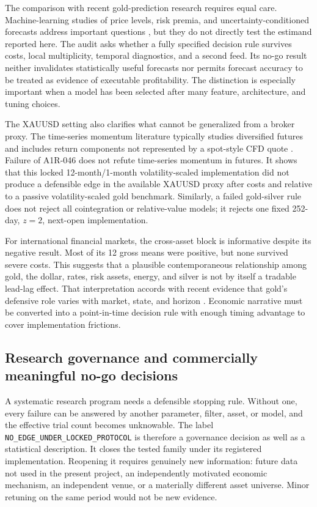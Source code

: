 The comparison with recent gold-prediction research requires equal care. Machine-learning studies of price levels, risk premia, and uncertainty-conditioned forecasts address important questions \citep{cohen2023,diaz2023,you2025}, but they do not directly test the estimand reported here. The audit asks whether a fully specified decision rule survives costs, local multiplicity, temporal diagnostics, and a second feed. Its no-go result neither invalidates statistically useful forecasts nor permits forecast accuracy to be treated as evidence of executable profitability. The distinction is especially important when a model has been selected after many feature, architecture, and tuning choices.

The XAUUSD setting also clarifies what cannot be generalized from a broker proxy. The time-series momentum literature typically studies diversified futures and includes return components not represented by a spot-style CFD quote \citep{moskowitz2012,hurst2017}. Failure of A1R-046 does not refute time-series momentum in futures. It shows that this locked 12-month/1-month volatility-scaled implementation did not produce a defensible edge in the available XAUUSD proxy after costs and relative to a passive volatility-scaled gold benchmark. Similarly, a failed gold-silver rule does not reject all cointegration or relative-value models; it rejects one fixed 252-day, $z=2$, next-open implementation.

For international financial markets, the cross-asset block is informative despite its negative result. Most of its 12 gross means were positive, but none survived severe costs. This suggests that a plausible contemporaneous relationship among gold, the dollar, rates, risk assets, energy, and silver is not by itself a tradable lead-lag effect. That interpretation accords with recent evidence that gold's defensive role varies with market, state, and horizon \citep{gurdgiev2024,ryan2024,faraj2025,xu2026}. Economic narrative must be converted into a point-in-time decision rule with enough timing advantage to cover implementation frictions.

\subsection{Research governance and commercially meaningful no-go decisions}

A systematic research program needs a defensible stopping rule. Without one, every failure can be answered by another parameter, filter, asset, or model, and the effective trial count becomes unknowable. The label \texttt{NO\_EDGE\_UNDER\_LOCKED\_PROTOCOL} is therefore a governance decision as well as a statistical description. It closes the tested family under its registered implementation. Reopening it requires genuinely new information: future data not used in the present project, an independently motivated economic mechanism, an independent venue, or a materially different asset universe. Minor retuning on the same period would not be new evidence.

